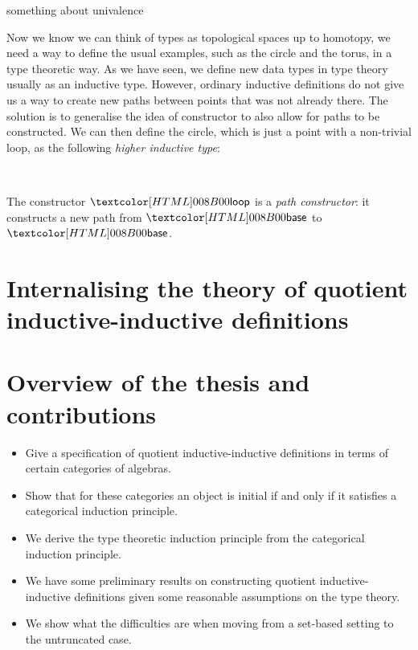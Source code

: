something about univalence

Now we know we can think of types as topological spaces up to
homotopy, we need a way to define the usual examples, such as the
circle and the torus, in a type theoretic way. As we have seen, we
define new data types in type theory usually as an inductive
type. However, ordinary inductive definitions do not give us a way to
create new paths between points that was not already there. The
solution is to generalise the idea of constructor to also allow for
paths to be constructed. We can then define the circle, which is just
a point with a non-trivial loop, as the following \emph{higher
  inductive type}:
\begin{datatype}{\circlety}{\Type}
  \constr{\circlebase}{\circlety} \\
  \constr{\circleloop}{\circlebase = \circlebase}
\end{datatype}
The constructor $\circleloop$ is a \emph{path constructor}: it
constructs a new path from $\circlebase$ to $\circlebase$. 

\section{Internalising the theory of quotient inductive-inductive definitions}



\section{Overview of the thesis and contributions}

\begin{itemize}
\item Give a specification of quotient inductive-inductive definitions
  in terms of certain categories of algebras.
\item Show that for these categories an object is initial if and only
  if it satisfies a categorical induction principle.
\item We derive the type theoretic induction principle from the
  categorical induction principle.
\item We have some preliminary results on constructing quotient
  inductive-inductive definitions given some reasonable assumptions on
  the type theory.
\item We show what the difficulties are when moving from a set-based
  setting to the untruncated case.
\end{itemize}